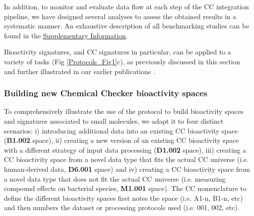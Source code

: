 In addition, to monitor and evaluate data flow at each step of the CC integration pipeline, we have designed several analyses to assess the obtained results in a systematic manner. An exhaustive description of all benchmarking studies can be found in the \hyperref[Protocols_SupplementaryInformation]{Supplementary Information}. 

Bioactivity signatures, and CC signatures in particular, can be applied to a variety of tasks (Fig \ref{Protocols_Fig1}c), as previously discussed in this section and further illustrated in our earlier publications \cite{duran-frigola_extending_2020, bertoni_bioactivity_2021}.

\subsubsection{Building new Chemical Checker bioactivity spaces}
\label{Building_NEW_CC_BIOACTIVITY_SPACES}

To comprehensively illustrate the use of the protocol to build bioactivity spaces and signatures associated to small molecules, we adapt it to four distinct scenarios: i) introducing additional data into an existing CC bioactivity space (\textbf{B1.002} space), ii) creating a new version of an existing CC bioactivity space with a different strategy of input data processing (\textbf{D1.002} space), iii) creating a CC bioactivity space from a novel data type that fits the actual CC universe (i.e. human-derived data, \textbf{D6.001} space) and iv) creating a CC bioactivity space from a novel data type that does not fit the actual CC universe (i.e. measuring compound effects on bacterial species, \textbf{M1.001} space). The CC nomenclature to define the different bioactivity spaces first notes the space (i.e. A1-n, B1-n, etc) and then numbers the dataset or processing protocols used (i.e. 001, 002, etc).